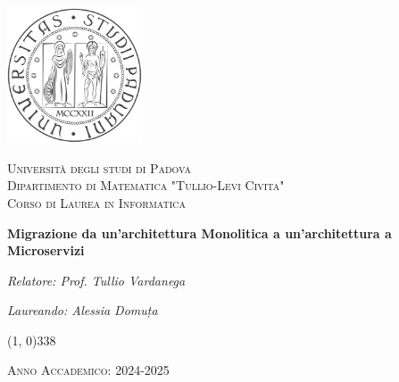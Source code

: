 \begin{titlepage}
    \begin{center}
        \includegraphics[width=0.3\textwidth]{images/unipd-logo.png}\par\vspace{1cm}  %
        \textsc{\LARGE Università degli studi di Padova}\\[1.5cm]  %
        \textsc{\Large Dipartimento di Matematica "Tullio-Levi Civita"}\\[0.5cm]  %
        \textsc{\large Corso di Laurea in Informatica}\\[0.5cm]  %

        \vspace{10pt}

        \vspace{100pt}

        \begin{LARGE}
            \textbf{Migrazione da un'architettura Monolitica a un'architettura a Microservizi}\\
        \end{LARGE}

        \vspace{200pt}
        \begin{minipage}[t]{0.45\textwidth}
        
            \begin{flushleft}
                \textit{Relatore: Prof. Tullio Vardanega }\\
            \end{flushleft}
        \end{minipage}%
        \hfill
        \begin{minipage}[t]{0.45\textwidth}
            \begin{flushright}
                \textit{Laureando: Alessia Domuța}\\
            \end{flushright}
        \end{minipage}

        \vfill
        \vspace{30pt}
        \line(1, 0){338} \\
        \begin{normalsize}
            \textsc{Anno Accademico: 2024-2025}
        \end{normalsize}
    \end{center}
\end{titlepage}
